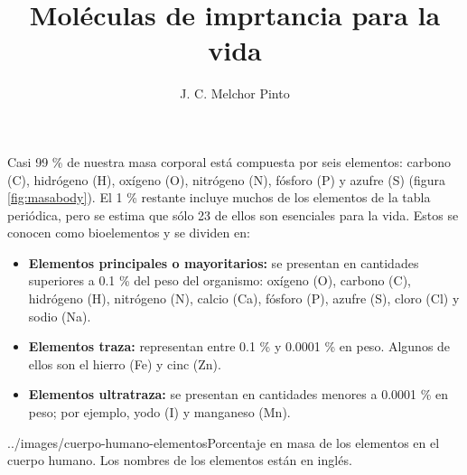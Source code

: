 \documentclass[12pt]{guia}
\title{Moléculas de imprtancia para la vida}
\author{J. C. Melchor Pinto}
\begin{document}
\pagestyle{headandfoot}
\addpoints
\INFO

\begin{startInfo}
    {
        Casi 99 \% de nuestra masa corporal está compuesta por seis elementos:
        carbono (C), hidrógeno (H), oxígeno (O), nitrógeno (N), fósforo
        (P) y azufre (S) (figura \ref{fig:masabody}). El 1  \% restante incluye muchos
        de los elementos de la tabla periódica, pero se estima que
        sólo 23 de ellos son esenciales para la vida. Estos se conocen
        como bioelementos y se dividen en:
        \begin{itemize}
            \item \textbf{Elementos principales o mayoritarios:} se presentan en cantidades superiores a 0.1 \% del peso del organismo: oxígeno (O),
                  carbono (C), hidrógeno (H), nitrógeno (N), calcio (Ca), fósforo
                  (P), azufre (S), cloro (Cl) y sodio (Na).
            \item \textbf{Elementos traza:} representan entre 0.1 \% y 0.0001 \% en peso.
                  Algunos de ellos son el hierro (Fe) y cinc (Zn).
            \item \textbf{Elementos ultratraza:} se presentan en cantidades menores a
                  0.0001 \% en peso; por ejemplo, yodo (I) y manganeso (Mn).
        \end{itemize}
    }{../images/cuerpo-humano-elementos}{Porcentaje en masa de los elementos
        en el cuerpo humano. Los nombres de los elementos están en inglés.}
\end{startInfo}
\begin{questions}
    
\end{questions}

\end{document}
